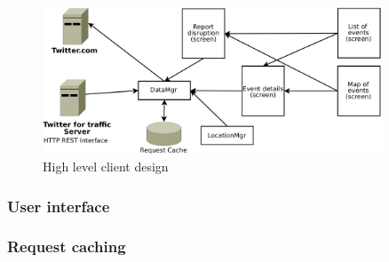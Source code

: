 \begin{figure}[htb]
\centering
\includegraphics[width=0.9\textwidth]{images/design/client/client_high_level_layout.pdf}
\caption{High level client design}
\label{fig:client_design}
\end{figure}



\subsubsection{User interface}
\subsubsection{Request caching}
